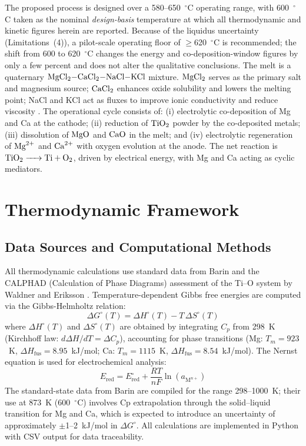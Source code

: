 \documentclass[sn-mathphys,Numbered]{sn-jnl}
\begin{document}
The proposed process is designed over a 580--650~$^{\circ}$C operating range, with 600~$^{\circ}$C taken as the nominal \emph{design-basis} temperature at which all thermodynamic and kinetic figures herein are reported. Because of the liquidus uncertainty (Limitations~(4)), a pilot-scale operating floor of $\geq$620~$^{\circ}$C is recommended; the shift from 600 to 620~$^{\circ}$C changes the energy and co-deposition-window figures by only a few percent and does not alter the qualitative conclusions. The melt is a quaternary $\ce{MgCl2-CaCl2-NaCl-KCl}$ mixture. $\ce{MgCl2}$ serves as the primary salt and magnesium source; $\ce{CaCl2}$ enhances oxide solubility and lowers the melting point; NaCl and KCl act as fluxes to improve ionic conductivity and reduce viscosity \cite{sato1999}. The operational cycle consists of: (i) electrolytic co-deposition of Mg and Ca at the cathode; (ii) reduction of $\ce{TiO2}$ powder by the co-deposited metals; (iii) dissolution of $\ce{MgO}$ and $\ce{CaO}$ in the melt; and (iv) electrolytic regeneration of $\ce{Mg^{2+}}$ and $\ce{Ca^{2+}}$ with oxygen evolution at the anode. The net reaction is $\ce{TiO2 -> Ti + O2}$, driven by electrical energy, with Mg and Ca acting as cyclic mediators.

\section{Thermodynamic Framework}

\subsection{Data Sources and Computational Methods}
\label{subsec:data}

All thermodynamic calculations use standard data from Barin \cite{barin1995} and the CALPHAD (Calculation of Phase Diagrams) assessment of the Ti--O system by Waldner and Eriksson \cite{waldner1999}. Temperature-dependent Gibbs free energies are computed via the Gibbs-Helmholtz relation:
\begin{equation}
\label{eq:gibbs}
\Delta G^{\circ}(T) = \Delta H^{\circ}(T) - T\,\Delta S^{\circ}(T)
\end{equation}
where $\Delta H^{\circ}(T)$ and $\Delta S^{\circ}(T)$ are obtained by integrating $C_p$ from 298~K (Kirchhoff law: $d\Delta H/dT = \Delta C_p$), accounting for phase transitions (Mg: $T_m=923$~K, $\Delta H_{\mathrm{fus}}=8.95$~kJ/mol; Ca: $T_m=1115$~K, $\Delta H_{\mathrm{fus}}=8.54$~kJ/mol). The Nernst equation is used for electrochemical analysis:
\begin{equation}
\label{eq:nernst}
E_{\mathrm{red}} = E^{\circ}_{\mathrm{red}} + \frac{RT}{nF}\ln(a_{\mathrm{M}^{n+}})
\end{equation}
The standard-state data from Barin \cite{barin1995} are compiled for the range 298--1000~K; their use at 873~K (600~$^{\circ}$C) involves Cp extrapolation through the solid--liquid transition for Mg and Ca, which is expected to introduce an uncertainty of approximately $\pm$1--2~kJ/mol in $\Delta G^{\circ}$. All calculations are implemented in Python with CSV output for data traceability.
\end{document}
